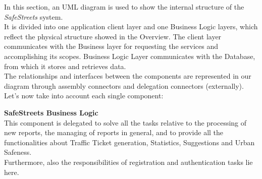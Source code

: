 In this section, an UML diagram is used to show the internal structure of the \textit{SafeStreets} system. \\
It is divided into one application client layer and one Business Logic layers, which reflect the physical structure showed in the Overview.
The client layer communicates with the Business layer for requesting the services and accomplishing its scopes. 
Business Logic Layer communicates with the Database, from which it stores and retrieves data.\\
The relationships and interfaces between the components are represented in our diagram through assembly connectors and delegation connectors (externally).
Let's now take into account each single component:\newline

\noindent\textbf{SafeStreets Business Logic}\\
This component is delegated to solve all the tasks relative to the processing of new reports, the managing of reports in general, and to provide all the functionalities about Traffic Ticket generation, Statistics, Suggestions and Urban Safeness.\\
Furthermore, also the responsibilities of registration and authentication tasks lie here. 

